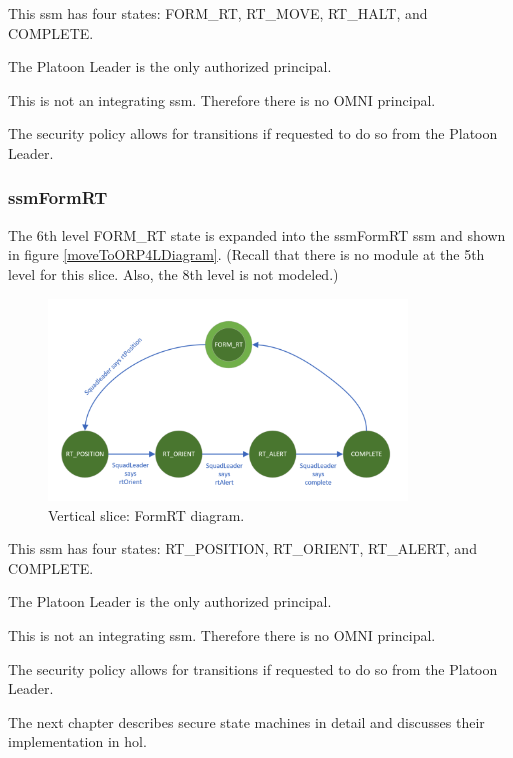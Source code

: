 \documentclass[../../main/main.tex]{subfiles}
\begin{document}
This \gls{ssm} has four states: FORM_RT, RT_MOVE, RT_HALT, and COMPLETE.  

The Platoon Leader is the only authorized principal.

This is not an integrating \gls{ssm}.  Therefore there is no OMNI principal.  

The security policy allows for transitions if requested to do so from the Platoon Leader.

\clearpage

\subsubsection{ssmFormRT}\label{sssec:ssmFormRT}
The 6th level FORM_RT state is expanded into the ssmFormRT \gls{ssm} and shown in figure \ref{moveToORP4LDiagram}.  (Recall that there is no module at the 5th level for this slice.  Also, the 8th level is not modeled.)

\begin{figure}[h!]
\centering
\includegraphics[width=0.85\textwidth]{../figures/ssmFormRTDiagram}
\caption{\label{ssmFormRTDiagram} Vertical slice: FormRT diagram.}
\end{figure}

This \gls{ssm} has four states: RT_POSITION, RT_ORIENT, RT_ALERT, and COMPLETE.  

The Platoon Leader is the only authorized principal.

This is not an integrating \gls{ssm}.  Therefore there is no OMNI principal.  

The security policy allows for transitions if requested to do so from the Platoon Leader.

The next chapter describes secure state machines in detail and discusses their implementation in \gls{hol}.
\end{document}
